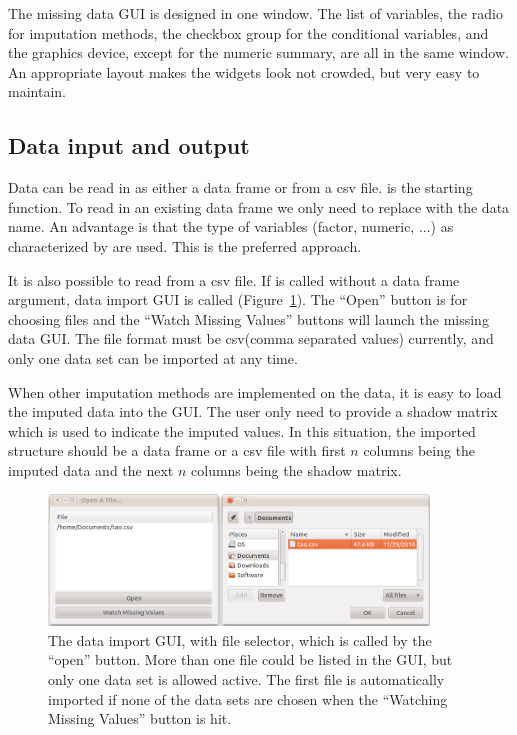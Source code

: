 \documentclass[article]{jss}
\begin{document}
The missing data GUI is designed in one window. The list of variables, the radio for imputation methods, the checkbox group for the conditional variables, and the graphics device, except for the numeric summary, are all in the same window. An appropriate layout makes the widgets look not crowded, but very easy to maintain. 


\subsection{Data input and output}

Data can be read in as either a data frame or from a csv file.  is the starting function. To read in an existing data frame we only need to replace  with the data name. An advantage is that the type of variables (factor, numeric, ...) as characterized by  are used. This is the preferred approach.

It is also possible to read from a csv file.  If  is called without a data frame argument, data import GUI is called (Figure~\ref{fig: import}).  The ``Open'' button is for choosing files and the ``Watch Missing Values'' buttons will launch the missing data GUI. The file format must be csv(comma separated values) currently, and only one data set can be imported at any time.

When other imputation methods are implemented on the data, it is easy to load the imputed data into the GUI. The user only need to provide a shadow matrix which is used to indicate the imputed values. In this situation, the imported structure should be a data frame or a csv file with first $n$ columns being the imputed data and the next $n$ columns being the shadow matrix.

\begin{center}
\begin{figure}[h]
\begin{centering}
\includegraphics[width=0.9\textwidth]{fig6}
\par\end{centering}
\caption{The data import GUI, with file selector, which is called by the ``open'' button. More than one file could be listed in the GUI, but only one data set is allowed active. The first file is automatically imported if none of the data sets are chosen when the ``Watching Missing Values'' button is hit. }
\label{fig: import}
\end{figure}
\par\end{center}
\end{document}
